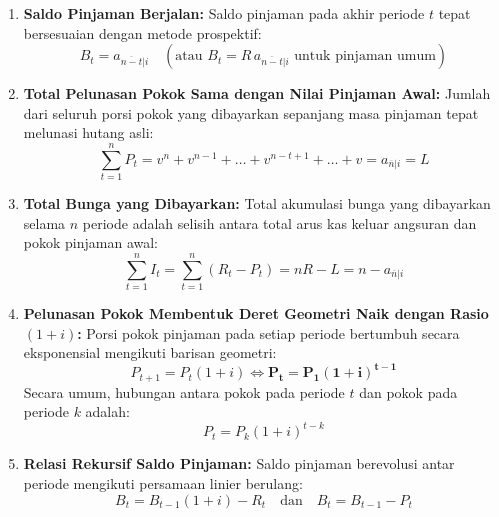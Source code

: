 \documentclass[11pt,a4paper]{article}
\begin{document}
\begin{theorembox}
\begin{enumerate}[label=\textbf{\arabic*.}]
    \item \textbf{Saldo Pinjaman Berjalan:}
    Saldo pinjaman pada akhir periode $t$ tepat bersesuaian dengan metode prospektif:
    \begin{equation}
        B_t = a_{\overline{n-t}|i} \quad (\text{atau } B_t = R \, a_{\overline{n-t}|i} \text{ untuk pinjaman umum})
    \end{equation}
    
    \item \textbf{Total Pelunasan Pokok Sama dengan Nilai Pinjaman Awal:}
    Jumlah dari seluruh porsi pokok yang dibayarkan sepanjang masa pinjaman tepat melunasi hutang asli:
    \begin{equation}
        \sum_{t=1}^n P_t = v^n + v^{n-1} + \dots + v^{n-t+1} + \dots + v = a_{\overline{n}|i} = L
    \end{equation}

    \item \textbf{Total Bunga yang Dibayarkan:}
    Total akumulasi bunga yang dibayarkan selama $n$ periode adalah selisih antara total arus kas keluar angsuran dan pokok pinjaman awal:
    \begin{equation}
        \sum_{t=1}^n I_t = \sum_{t=1}^n (R_t - P_t) = n R - L = n - a_{\overline{n}|i}
    \end{equation}

    \item \textbf{Pelunasan Pokok Membentuk Deret Geometri Naik dengan Rasio $(1+i)$:}
    Porsi pokok pinjaman pada setiap periode bertumbuh secara eksponensial mengikuti barisan geometri:
    \begin{equation}
        P_{t+1} = P_t (1+i) \iff \mathbf{P_t = P_1 (1+i)^{t-1}}
    \end{equation}
    Secara umum, hubungan antara pokok pada periode $t$ dan pokok pada periode $k$ adalah:
    \begin{equation}
        P_t = P_k (1+i)^{t-k}
    \end{equation}

    \item \textbf{Relasi Rekursif Saldo Pinjaman:}
    Saldo pinjaman berevolusi antar periode mengikuti persamaan linier berulang:
    \begin{equation}
        B_{t} = B_{t-1}(1+i) - R_t \quad \text{dan} \quad B_t = B_{t-1} - P_t
    \end{equation}
\end{enumerate}
\end{theorembox}
\end{document}
